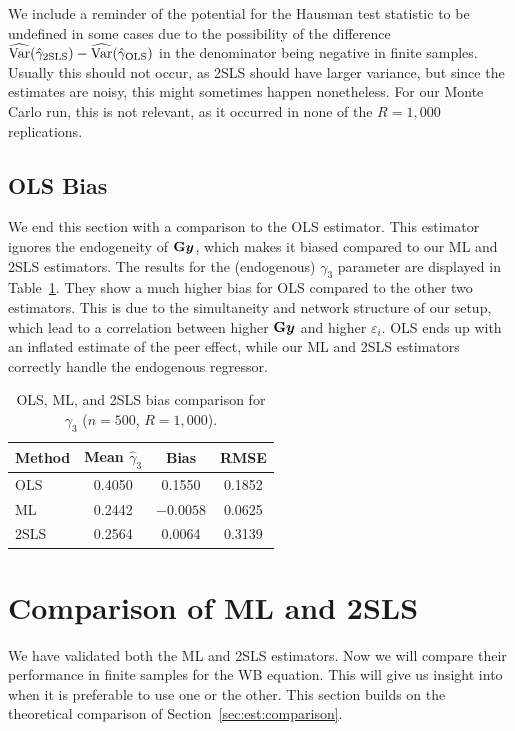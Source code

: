 \begin{remark}
We include a reminder of the potential for the Hausman test statistic to be undefined in some cases due to the possibility of the difference $\widehat{\operatorname{Var}}(\hat{\gamma}_{\text{2SLS}}) - \widehat{\operatorname{Var}}(\hat{\gamma}_{\text{OLS}})$ in the denominator being negative in finite samples. Usually this should not occur, as 2SLS should have larger variance, but since the estimates are noisy, this might sometimes happen nonetheless. For our Monte Carlo run, this is not relevant, as it occurred in none of the $R = 1{,}000$ replications.
\end{remark}

\subsection{OLS Bias}
\label{sec:mc:ols_bias}
We end this section with a comparison to the OLS estimator. This estimator ignores the endogeneity of $\mathbf{G}\bm{y}$, which makes it biased compared to our ML and 2SLS estimators. The results for the (endogenous) $\gamma_3$ parameter are displayed in Table~\ref{tab:mc_ols_bias}. They show a much higher bias for OLS compared to the other two estimators. This is due to the simultaneity and network structure of our setup, which lead to a correlation between higher $\mathbf{G}\bm{y}$ and higher $\varepsilon_i$. OLS ends up with an inflated estimate of the peer effect, while our ML and 2SLS estimators correctly handle the endogenous regressor.

\begin{table}[htbp]
\centering
\caption[OLS, ML, and 2SLS bias comparison for $\gamma_3$]{OLS, ML, and 2SLS bias comparison for $\gamma_3$ ($n = 500$, $R = 1{,}000$).}
\label{tab:mc_ols_bias}
\begin{tabular}{lccc}
\toprule
Method & Mean $\hat\gamma_3$ & Bias & RMSE \\
\midrule
OLS & 0.4050 & 0.1550 & 0.1852 \\
ML & 0.2442 & $-0.0058$ & 0.0625 \\
2SLS & 0.2564 & 0.0064 & 0.3139 \\
\bottomrule
\end{tabular}
\end{table}

\section{Comparison of ML and 2SLS}
\label{sec:mc:comparison}
We have validated both the ML and 2SLS estimators. Now we will compare their performance in finite samples for the WB equation. This will give us insight into when it is preferable to use one or the other. This section builds on the theoretical comparison of Section~\ref{sec:est:comparison}.

